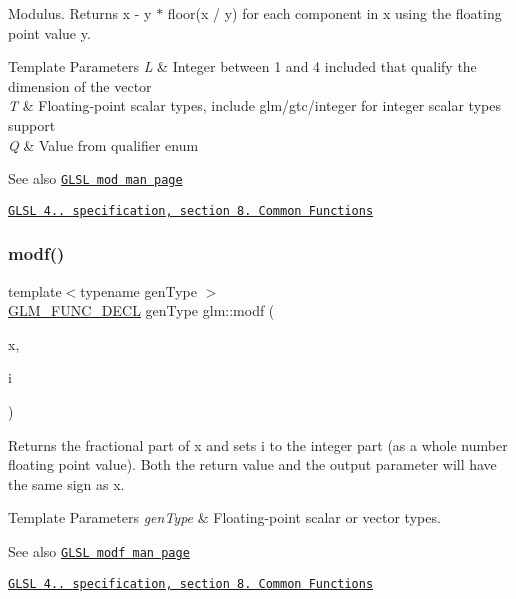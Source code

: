 Modulus. Returns x -\/ y $\ast$ floor(x / y) for each component in x using the floating point value y.


\begin{DoxyTemplParams}{Template Parameters}
{\em L} & Integer between 1 and 4 included that qualify the dimension of the vector \\
\hline
{\em T} & Floating-\/point scalar types, include glm/gtc/integer for integer scalar types support \\
\hline
{\em Q} & Value from qualifier enum\\
\hline
\end{DoxyTemplParams}
\begin{DoxySeeAlso}{See also}
\href{http://www.opengl.org/sdk/docs/manglsl/xhtml/mod.xml}{\tt G\+L\+SL mod man page} 

\href{http://www.opengl.org/registry/doc/GLSLangSpec.4.20.8.pdf}{\tt G\+L\+SL 4.. specification, section 8. Common Functions} 
\end{DoxySeeAlso}
\mbox{\label{group__core__func__common_ga85e33f139b8db1b39b590a5713b9e679}} 
\subsubsection{\texorpdfstring{modf()}{modf()}}
{\footnotesize\ttfamily template$<$typename gen\+Type $>$ \\
\hyperlink{setup_8hpp_ab2d052de21a70539923e9bcbf6e83a51}{G\+L\+M\+\_\+\+F\+U\+N\+C\+\_\+\+D\+E\+CL} gen\+Type glm\+::modf (\begin{DoxyParamCaption}\item[{gen\+Type}]{x,  }\item[{gen\+Type \&}]{i }\end{DoxyParamCaption})}

Returns the fractional part of x and sets i to the integer part (as a whole number floating point value). Both the return value and the output parameter will have the same sign as x.


\begin{DoxyTemplParams}{Template Parameters}
{\em gen\+Type} & Floating-\/point scalar or vector types.\\
\hline
\end{DoxyTemplParams}
\begin{DoxySeeAlso}{See also}
\href{http://www.opengl.org/sdk/docs/manglsl/xhtml/modf.xml}{\tt G\+L\+SL modf man page} 

\href{http://www.opengl.org/registry/doc/GLSLangSpec.4.20.8.pdf}{\tt G\+L\+SL 4.. specification, section 8. Common Functions} 
\end{DoxySeeAlso}
\mbox{\label{group__core__func__common_gafa03aca8c4713e1cc892aa92ca135a7e}} 
